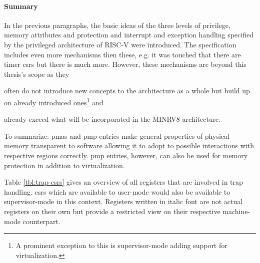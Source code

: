 \paragraph{Summary}
In the previous paragraphs, the basic ideas of the three levels of privilege, memory attributes and protection and interrupt and exception handling specified by the privileged architecture of RISC-V \cite{RiscVISAP} were introduced.
The specification includes even more mechanisms then these, e.g. it was touched that there are timer \glspl{csr} but there is much more.
However, these mechanisms are beyond this thesis's scope as they \begin{enumerate*}[label=\alph*)]
    \item often do not introduce new concepts to the architecture as a whole but build up on already introduced ones\footnote{%
        A prominent exception to this is supervisor-mode adding support for virtualization.
    } and
    \item already exceed what will be incorporated in the MINRV8 architecture.
\end{enumerate*}

To summarize:
\glspl{pma} and \gls{pmp} entries make general properties of physical memory transparent to software allowing it to adopt to possible interactions with respective regions correctly.
\gls{pmp} entries, however, can also be used for memory protection in addition to virtualization.

Table \ref{tbl:trap-csrs} gives an overview of all registers that are involved in trap handling.
\glspl{csr} which are available to user-mode would also be available to supervisor-mode in this context.
Registers written in italic font are not actual registers on their own but provide a restricted view on their respective machine-mode counterpart.

